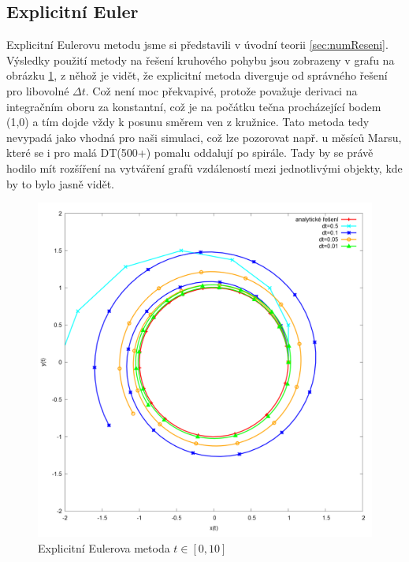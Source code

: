 \subsection{Explicitní Euler}
Explicitní Eulerovu metodu jsme si představili v úvodní teorii \ref{sec:numReseni}. Výsledky použití metody na řešení kruhového pohybu jsou zobrazeny v grafu na obrázku \ref{fig:explicitEuler}, z něhož je vidět, že explicitní metoda diverguje od správného řešení pro libovolné $ \Delta t $. Což není moc překvapivé, protože považuje derivaci na integračním oboru za konstantní, což je na počátku tečna procházející bodem (1,0) a tím dojde vždy k posunu směrem ven z kružnice. Tato metoda tedy nevypadá jako vhodná pro naši simulaci, což lze pozorovat např. u měsíců Marsu, které se i pro malá DT(500+) pomalu oddalují po spirále. Tady by se právě hodilo mít rozšíření na vytváření grafů vzdáleností mezi jednotlivými objekty, kde by to bylo jasně vidět.
\begin{figure}
	\caption{Explicitní Eulerova metoda $ t\in [0,10] $}
	\label{fig:explicitEuler} 
	\centering
	\includegraphics[width=\linewidth]{Figs/explicitEuler}
\end{figure}
